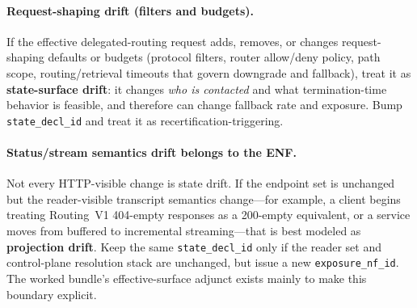 \documentclass[11pt]{article}
\begin{document}
\paragraph{Request-shaping drift (filters and budgets).}
If the effective delegated-routing request adds, removes, or changes request-shaping defaults or budgets (protocol filters, router allow/deny policy, path scope, routing/retrieval timeouts that govern downgrade and fallback), treat it as \textbf{state-surface drift}: it changes \emph{who is contacted} and what termination-time behavior is feasible, and therefore can change fallback rate and exposure.
Bump \texttt{state\_decl\_id} and treat it as recertification-triggering.\cite{series:deployedsurfaces,series:planstateequiv}

\paragraph{Status/stream semantics drift belongs to the ENF.}
Not every HTTP-visible change is state drift. If the endpoint set is unchanged but the reader-visible transcript semantics change---for example, a client begins treating Routing~V1 404-empty responses as a 200-empty equivalent, or a service moves from buffered to incremental streaming---that is best modeled as \textbf{projection drift}. Keep the same \texttt{state\_decl\_id} only if the reader set and control-plane resolution stack are unchanged, but issue a new \texttt{exposure\_nf\_id}. The worked bundle's effective-surface adjunct exists mainly to make this boundary explicit.\cite{series:deployedsurfaces,series:traceifaces,series:planstateequiv}
\end{document}
